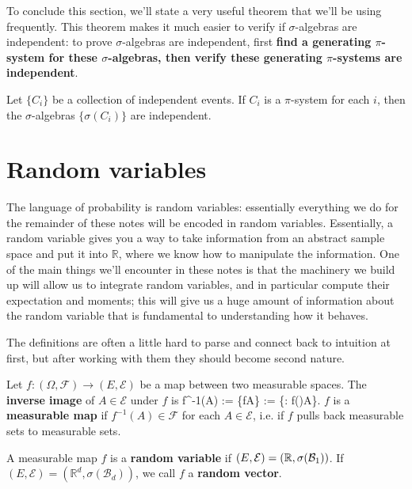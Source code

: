 To conclude this section, we'll state a very useful theorem that we'll be using frequently. This theorem makes it much easier to verify if $\sigma$-algebras are independent: to prove $\sigma$-algebras are independent, first \textbf{find a generating $\pi$-system for these $\sigma$-algebras, then verify these generating $\pi$-systems are independent}. 

\begin{theorem}
	Let $\{C_i\}$ be a collection of independent events. If $C_i$ is a $\pi$-system for each $i$, then the $\sigma$-algebras $\{\sigma(C_i)\}$ are independent. 
\end{theorem} 

\newpage
\section{Random variables}

The language of probability is random variables: essentially everything we do for the remainder of these notes will be encoded in random variables. Essentially, a random variable gives you a way to take information from an abstract sample space and put it into $\mathbb R$, where we know how to manipulate the information. One of the main things we'll encounter in these notes is that the machinery we build up will allow us to integrate random variables, and in particular compute their expectation and moments; this will give us a huge amount of information about the random variable that is fundamental to understanding how it behaves. 

The definitions are often a little hard to parse and connect back to intuition at first, but after working with them they should become second nature. 

\begin{definition}
	Let $f : (\Omega, \mathcal F)\rightarrow (E, \mathcal E)$ be a map between two measurable spaces. The \textbf{inverse image} of $A\in\mathcal E$ under $f$ is
	\eq
		f^{-1}(A) := \{f\in A\} := \{\omega\in\Omega : f(\omega)\in A\}.
	\qe
	$f$ is a \textbf{measurable map} if $f^{-1}(A)\in\mathcal F$ for each $A\in\mathcal E$, i.e. if $f$ pulls back measurable sets to measurable sets. 
\end{definition}

\begin{definition}
	A measurable map $f$ is a \textbf{random variable} if $(E, \mathcal E) = (\mathbb R, \sigma(\mathcal{B}_{1}))$. If $(E, \mathcal E) = (\mathbb R^d, \sigma(\mathcal B_d))$, we call $f$ a \textbf{random vector}. 
\end{definition}

